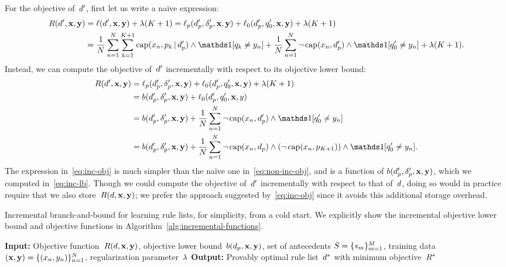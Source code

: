 \begin{arxiv}
%
For the objective of~${d}'$, first let us write a na\"ive expression:
\begin{align}
\Obj(\RL', \x, \y) &= \Loss(\RL', \x, \y) + \Reg (K + 1)
= \Loss_p(\Prefix', \Labels', \x, \y) + \Loss_0(\Prefix', \Default', \x, \y) + \Reg(K + 1) \nn \\
&= \frac{1}{N} \sum_{n=1}^N \sum_{k=1}^{K+1} \Cap(x_n, p_k \given \Prefix')
  \wedge \one [ q_k \neq y_n ] + \frac{1}{N}\sum_{n=1}^N \neg\, \Cap(x_n, \Prefix') \wedge
  \one [q'_0 \neq y_n] + \Reg (K+1). \label{eq:non-inc-obj}
\end{align}
Instead, we can compute the objective of~${d}'$ incrementally
with respect to its objective lower bound:
\begin{align}
\Obj(\RL', \x, \y) &=  \Loss_p(\Prefix', \Labels', \x, \y) +
  \Loss_0(\Prefix', \Default', \x, \y) + \Reg (K + 1) \nn \\
&= b(\Prefix', \Labels', \x, \y) + \Loss_0(\Prefix', \Default', \x, y) \nn \\
&= b(\Prefix', \Labels', \x, \y) + \frac{1}{N}\sum_{n=1}^N \neg\, \Cap(x_n, \Prefix') \wedge
  \one [q'_0 \neq y_n] \nn \\
&= b(\Prefix', \Labels', \x, \y) + \frac{1}{N}\sum_{n=1}^N \neg\, \Cap(x_n, \Prefix) \wedge
  (\neg\, \Cap(x_n, p_{K+1})) \wedge \one [q'_0 \neq y_n].
\label{eq:inc-obj}
\end{align}
The expression in~\eqref{eq:inc-obj} is much simpler than the na\"ive
one in~\eqref{eq:non-inc-obj}, and is a function of
$b(d_p', \delta_p', \mathbf{x}, \mathbf{y})$, which we computed in~\eqref{eq:inc-lb}.
Though we could compute the objective of~${d}'$ incrementally
with respect to that of~${d}$, doing so would in practice require
that we also store~$R({d}, \mathbf{x}, \mathbf{y})$; we prefer the approach suggested
by~\eqref{eq:inc-obj} since it avoids this additional storage overhead.

\begin{algorithm}[t!]
  \caption{Incremental branch-and-bound for learning rule lists, for simplicity, from a cold start.
  We explicitly show the incremental objective lower bound and objective functions in Algorithm~\ref{alg:incremental-functions}.}
\label{alg:incremental}
\begin{algorithmic}
\normalsize
\State \textbf{Input:} Objective function~$R({d}, \mathbf{x}, \mathbf{y})$,
objective lower bound~${b(d_p, \mathbf{x}, \mathbf{y})}$,
set of antecedents ${S = \{s_m\}_{m=1}^M}$,
training data~$(\mathbf{x}, \mathbf{y}) = {\{(x_n, y_n)\}_{n=1}^N}$,
regularization parameter~${\lambda}$
\State \textbf{Output:} Provably optimal rule list~$d^*$ with minimum objective~$R^*$ \\


\end{algorithmic}
\end{algorithm}
\end{arxiv}
